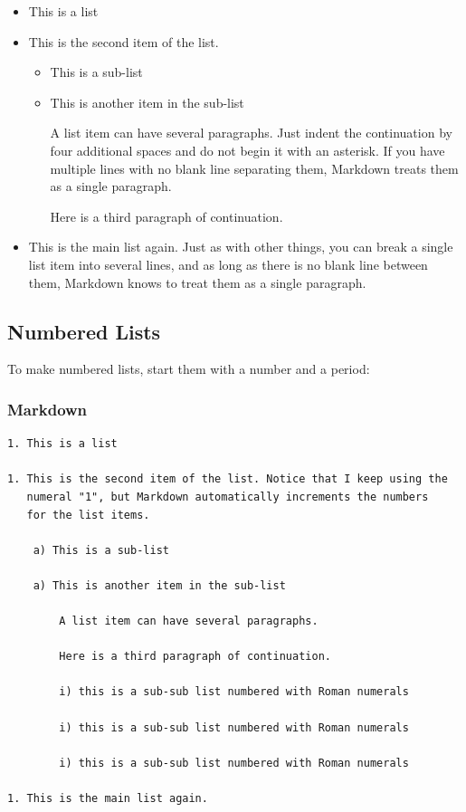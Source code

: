 \documentclass[
]{article}
\begin{document}
\begin{itemize}
\item
  This is a list
\item
  This is the second item of the list.

  \begin{itemize}
  \item
    This is a sub-list
  \item
    This is another item in the sub-list

    A list item can have several paragraphs. Just indent the
    continuation by four additional spaces and do not begin it with an
    asterisk. If you have multiple lines with no blank line separating
    them, Markdown treats them as a single paragraph.

    Here is a third paragraph of continuation.
  \end{itemize}
\item
  This is the main list again. Just as with other things, you can break
  a single list item into several lines, and as long as there is no
  blank line between them, Markdown knows to treat them as a single
  paragraph.
\end{itemize}

\hypertarget{numbered-lists}{%
\subsection{Numbered Lists}\label{numbered-lists}}

To make numbered lists, start them with a number and a period:

\hypertarget{markdown-5}{%
\subsubsection{Markdown}\label{markdown-5}}

\begin{verbatim}
1. This is a list

1. This is the second item of the list. Notice that I keep using the 
   numeral "1", but Markdown automatically increments the numbers
   for the list items.

    a) This is a sub-list

    a) This is another item in the sub-list
    
        A list item can have several paragraphs.
        
        Here is a third paragraph of continuation.
        
        i) this is a sub-sub list numbered with Roman numerals

        i) this is a sub-sub list numbered with Roman numerals

        i) this is a sub-sub list numbered with Roman numerals

1. This is the main list again.
\end{verbatim}
\end{document}
